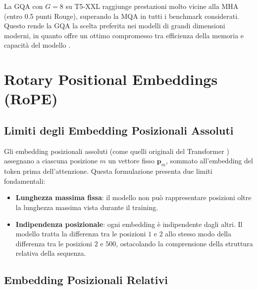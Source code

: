 La GQA con $G=8$ su T5-XXL raggiunge prestazioni molto vicine alla MHA
(entro 0.5 punti Rouge), superando la MQA in tutti i benchmark considerati.
Questo rende la GQA la scelta preferita nei modelli di grandi dimensioni
moderni, in quanto offre un ottimo compromesso tra efficienza della memoria
e capacità del modello \citep{ainslie2023gqa}.

\section{Rotary Positional Embeddings (RoPE)}
\label{sec:rope}

\subsection{Limiti degli Embedding Posizionali Assoluti}
\label{subsec:absolute-pe-limits}

Gli embedding posizionali assoluti (come quelli originali del Transformer
\citep{vaswani2017attention}) assegnano a ciascuna posizione $m$ un vettore
fisso $\mathbf{p}_m$, sommato all'embedding del token prima dell'attenzione.
Questa formulazione presenta due limiti fondamentali:

\begin{itemize}
  \item \textbf{Lunghezza massima fissa}: il modello non può rappresentare
        posizioni oltre la lunghezza massima vista durante il training.
  \item \textbf{Indipendenza posizionale}: ogni embedding è indipendente
        dagli altri. Il modello tratta la differenza tra le posizioni $1$ e $2$
        allo stesso modo della differenza tra le posizioni $2$ e $500$,
        ostacolando la comprensione della struttura relativa della sequenza.
\end{itemize}

\subsection{Embedding Posizionali Relativi}
\label{subsec:relative-pe}

